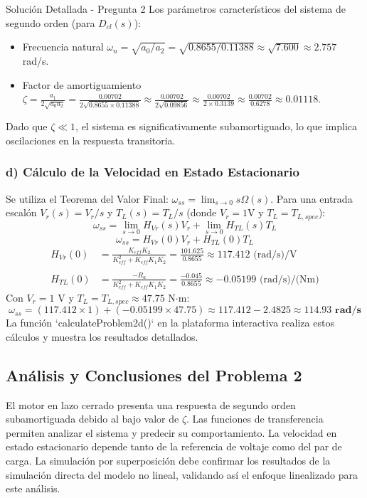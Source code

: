 \documentclass[12pt]{article}
\begin{document}
\begin{solutionbox}{Solución Detallada - Pregunta 2}
Los parámetros característicos del sistema de segundo orden (para $D_{cl}(s)$):
\begin{itemize}
    \item Frecuencia natural $\omega_n = \sqrt{a_0/a_2} = \sqrt{0.8655 / 0.11388} \approx \sqrt{7.600} \approx 2.757$ rad/s.
    \item Factor de amortiguamiento $\zeta = \frac{a_1}{2\sqrt{a_0 a_2}} = \frac{0.00702}{2\sqrt{0.8655 \times 0.11388}} \approx \frac{0.00702}{2\sqrt{0.09856}} \approx \frac{0.00702}{2 \times 0.3139} \approx \frac{0.00702}{0.6278} \approx 0.01118$.
\end{itemize}
Dado que $\zeta \ll 1$, el sistema es significativamente subamortiguado, lo que implica oscilaciones en la respuesta transitoria.

\subsubsection*{d) Cálculo de la Velocidad en Estado Estacionario}
Se utiliza el Teorema del Valor Final: $\omega_{ss} = \lim_{s \to 0} s \Omega(s)$.
Para una entrada escalón $V_r(s) = V_r/s$ y $T_L(s) = T_L/s$ (donde $V_r=1$V y $T_L=T_{L,spec}$):
\[ \omega_{ss} = \lim_{s \to 0} H_{Vr}(s)V_r + \lim_{s \to 0} H_{TL}(s)T_L \]
\[ \omega_{ss} = H_{Vr}(0)V_r + H_{TL}(0)T_L \]
\begin{align*}
    H_{Vr}(0) &= \frac{K_{eff}K_2}{K_{eff}^2 + K_{eff}K_1K_2} = \frac{101.625}{0.8655} \approx 117.412 \text{ (rad/s)/V} \\\\
    H_{TL}(0) &= \frac{-R_a}{K_{eff}^2 + K_{eff}K_1K_2} = \frac{-0.045}{0.8655} \approx -0.05199 \text{ (rad/s)/(Nm)}
\end{align*}
Con $V_r = 1$ V y $T_L = T_{L,spec} \approx 47.75$ N$\cdot$m:
\[ \omega_{ss} = (117.412 \times 1) + (-0.05199 \times 47.75) \approx 117.412 - 2.4825 \approx \mathbf{114.93 \text{ rad/s}} \]
La función `calculateProblem2d()` en la plataforma interactiva realiza estos cálculos y muestra los resultados detallados.

\subsection*{Análisis y Conclusiones del Problema 2}
El motor en lazo cerrado presenta una respuesta de segundo orden subamortiguada debido al bajo valor de $\zeta$. Las funciones de transferencia permiten analizar el sistema y predecir su comportamiento. La velocidad en estado estacionario depende tanto de la referencia de voltaje como del par de carga. La simulación por superposición debe confirmar los resultados de la simulación directa del modelo no lineal, validando así el enfoque linealizado para este análisis.

\end{solutionbox}
\end{document}
